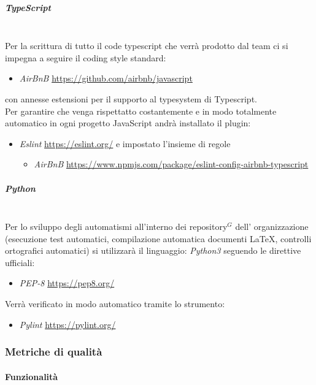 \subparagraph{TypeScript}
\mbox{}\\
Per la scrittura di tutto il code typescript che verrà prodotto dal team ci si impegna a seguire il coding
style standard:
\begin{itemize}
    \item \textit{AirBnB} \href{https://github.com/airbnb/javascript}{https://github.com/airbnb/javascript}
\end{itemize}
con annesse estensioni per il supporto al typesystem di Typescript.\\

Per garantire che venga rispettatto costantemente e in modo totalmente automatico in ogni progetto JavaScript
andrà installato il plugin:
\begin{itemize}
    \item \textit{Eslint} \href{https://eslint.org/}{https://eslint.org/} e impostato l'insieme di regole
    \begin{itemize}
        \item \textit{AirBnB} \href{https://www.npmjs.com/package/eslint-config-airbnb-typescript}{https://www.npmjs.com/package/eslint-config-airbnb-typescript}
    \end{itemize}
\end{itemize}

\subparagraph{Python}
\mbox{}\\
Per lo sviluppo degli automatismi all'interno dei repository$^G$  dell' organizzazione (esecuzione test automatici,
compilazione automatica documenti \LaTeX, controlli ortografici automatici) si utilizzarà il linguaggio:
\textit{Python3} seguendo le direttive ufficiali:
\begin{itemize}
    \item \textit{PEP-8} \href{https://pep8.org/}{https://pep8.org/}
\end{itemize}
Verrà verificato in modo automatico tramite lo strumento:
\begin{itemize}
    \item \textit{Pylint} \href{https://pylint.org/}{https://pylint.org/}
\end{itemize}

\newpage
\subsubsection{Metriche di qualità}
\paragraph{Funzionalità}
\setlength\extrarowheight{5pt}


